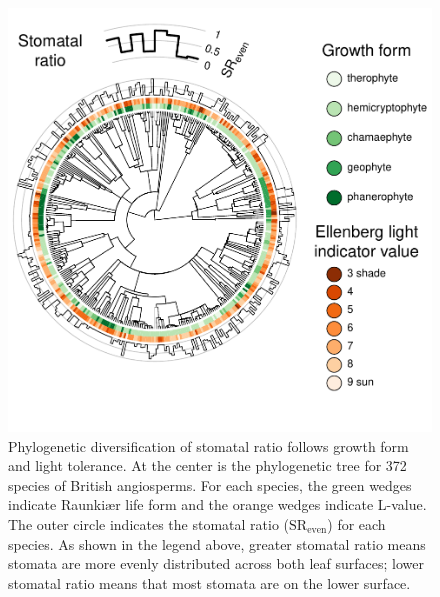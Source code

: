 \documentclass[12pt, oneside]{article}
\newcommand{\el}{L-value}
\begin{document}
\begin{figure}[ht]
\centerline{\includegraphics[width=\textwidth]{figures/figure_phylo-lifeform.pdf}}
\caption{Phylogenetic diversification of stomatal ratio follows growth form and light tolerance. At the center is the phylogenetic tree for 372 species of British angiosperms. For each species, the green wedges indicate Raunki\ae r life form and the orange wedges indicate \el. The outer circle indicates the stomatal ratio ($\mathrm{SR_{even}}$) for each species. As shown in the legend above, greater stomatal ratio means stomata are more evenly distributed across both leaf surfaces; lower stomatal ratio means that most stomata are on the lower surface.} 
\label{fig:phylo-lifeform}
\end{figure}
\end{document}
